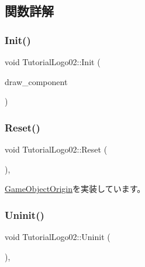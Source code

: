 \subsection{関数詳解}
\mbox{\label{class_tutorial_logo02_a1ed74182381f5a74b517519ff2248878}} 
\subsubsection{\texorpdfstring{Init()}{Init()}}
{\footnotesize\ttfamily void Tutorial\+Logo02\+::\+Init (\begin{DoxyParamCaption}\item[{\mbox{\hyperlink{class_draw_component}{Draw\+Component}} $\ast$}]{draw\+\_\+component }\end{DoxyParamCaption})}

\mbox{\label{class_tutorial_logo02_a73afa56b1e98736072745dc414ebd29f}} 
\subsubsection{\texorpdfstring{Reset()}{Reset()}}
{\footnotesize\ttfamily void Tutorial\+Logo02\+::\+Reset (\begin{DoxyParamCaption}{ }\end{DoxyParamCaption})\hspace{0.3cm}{\ttfamily [override]}, {\ttfamily [virtual]}}



\mbox{\hyperlink{class_game_object_origin_af9af378a4fd9028316a6fdb461ed6a10}{Game\+Object\+Origin}}を実装しています。

\mbox{\label{class_tutorial_logo02_ab9d0ac3888adf512c29fc0fe7f9beb4e}} 
\subsubsection{\texorpdfstring{Uninit()}{Uninit()}}
{\footnotesize\ttfamily void Tutorial\+Logo02\+::\+Uninit (\begin{DoxyParamCaption}{ }\end{DoxyParamCaption})\hspace{0.3cm}{\ttfamily [override]}, {\ttfamily [virtual]}}



